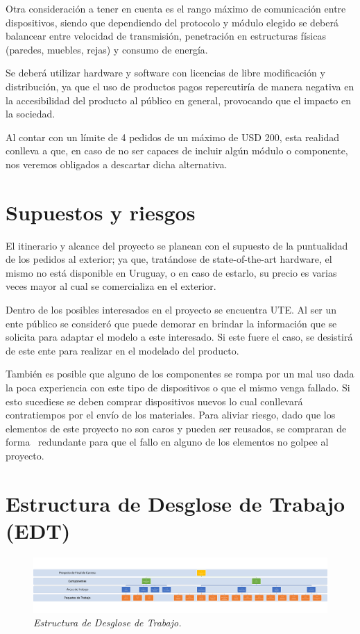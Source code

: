 Otra consideración a tener en cuenta es el rango máximo de comunicación entre dispositivos, siendo que dependiendo del protocolo y módulo elegido se deberá balancear entre velocidad de transmisión, penetración en estructuras físicas (paredes, muebles, rejas) y consumo de energía.

Se deberá utilizar hardware y software con licencias de libre modificación y distribución, ya que el uso de productos pagos repercutiría de manera negativa en la accesibilidad del producto al público en general, provocando que el impacto en la sociedad.

Al contar con un límite de 4 pedidos de un máximo de USD 200, esta realidad conlleva a que, en caso de no ser capaces de incluir algún módulo o componente, nos veremos obligados a descartar dicha alternativa.

\section{Supuestos y riesgos}

El itinerario y alcance del proyecto se planean con el supuesto de la puntualidad de los pedidos al exterior; ya que, tratándose de state-of-the-art hardware, el mismo no está disponible en Uruguay, o en caso de estarlo, su precio es varias veces mayor al cual se comercializa en el exterior. 

Dentro de los posibles interesados en el proyecto se encuentra UTE. Al ser un ente público se consideró que puede demorar en brindar la información que se solicita para adaptar el modelo a este interesado. Si este fuere el caso, se desistirá de este ente para realizar en el modelado del producto.

También es posible que alguno de los componentes se rompa por un mal uso dada la poca experiencia con este tipo de dispositivos o que el mismo venga fallado. Si esto sucediese se deben comprar dispositivos nuevos lo cual conllevará contratiempos por el envío de los materiales. Para aliviar riesgo, dado que los elementos de este proyecto no son caros y pueden ser reusados, se compraran de forma  redundante para que el fallo en alguno de los elementos no golpee al proyecto.

\section{Estructura de Desglose de Trabajo (EDT)}

\begin{figure}[h]
  \centering
  \includegraphics[width=\textwidth, keepaspectratio]{images/EDT}
  \caption{\textit{Estructura de Desglose de Trabajo.}}
  \label{fig:edt}
\end{figure}

